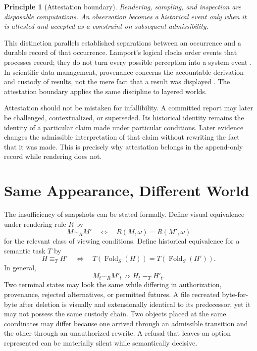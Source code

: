\documentclass[11pt]{article}
\newtheorem{principle}{Principle}
\newcommand{\Fold}{\operatorname{Fold}}
\begin{document}
\begin{principle}[Attestation boundary]
Rendering, sampling, and inspection are disposable computations. An observation becomes a historical event only when it is attested and accepted as a constraint on subsequent admissibility.
\end{principle}

This distinction parallels established separations between an occurrence and a durable record of that occurrence. Lamport's logical clocks order events that processes record; they do not turn every possible perception into a system event \cite{lamport1978}. In scientific data management, provenance concerns the accountable derivation and custody of results, not the mere fact that a result was displayed \cite{buneman2001,moreau2013}. The attestation boundary applies the same discipline to layered worlds.

Attestation should not be mistaken for infallibility. A committed report may later be challenged, contextualized, or superseded. Its historical identity remains the identity of a particular claim made under particular conditions. Later evidence changes the admissible interpretation of that claim without rewriting the fact that it was made. This is precisely why attestation belongs in the append-only record while rendering does not.

\section{Same Appearance, Different World}

The insufficiency of snapshots can be stated formally. Define visual equivalence under rendering rule $R$ by
\[
M\sim_R M' \quad\Longleftrightarrow\quad
R(M,\omega)=R(M',\omega)
\]
for the relevant class of viewing conditions. Define historical equivalence for a semantic task $T$ by
\[
H\equiv_T H' \quad\Longleftrightarrow\quad
T(\Fold_S(H))=T(\Fold_S(H')).
\]
In general,
\[
M_t\sim_R M'_t \not\Rightarrow H_t\equiv_T H'_t.
\]
Two terminal states may look the same while differing in authorization, provenance, rejected alternatives, or permitted futures. A file recreated byte-for-byte after deletion is visually and extensionally identical to its predecessor, yet it may not possess the same custody chain. Two objects placed at the same coordinates may differ because one arrived through an admissible transition and the other through an unauthorized rewrite. A refusal that leaves an option represented can be materially silent while semantically decisive.
\end{document}
